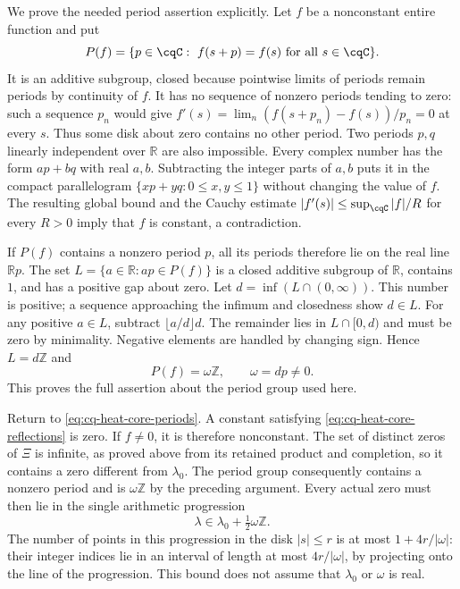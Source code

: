 We prove the needed period assertion explicitly. Let $f$ be a
nonconstant entire function and put
\[
 P(f)=\{p\in\cqC:\ f(s+p)=f(s)\text{ for all }s\in\cqC\}.
\]
It is an additive subgroup, closed because pointwise limits of
periods remain periods by continuity of $f$. It has no sequence
of nonzero periods tending to zero: such a sequence $p_n$ would
give
$f'(s)=\lim_n(f(s+p_n)-f(s))/p_n=0$ at every $s$.
Thus some disk about zero contains no other period.
Two periods $p,q$ linearly independent over $\mathbb R$ are
also impossible. Every complex number has the form $ap+bq$
with real $a,b$. Subtracting the integer parts of $a,b$
puts it in the compact parallelogram
$\{xp+yq:0\leq x,y\leq1\}$ without changing the value of $f$.
The resulting global bound and the Cauchy estimate
$|f'(s)|\leq\sup_{\cqC}|f|/R$ for every $R>0$ imply that
$f$ is constant, a contradiction.

If $P(f)$ contains a nonzero period $p$, all its periods
therefore lie on the real line $\mathbb Rp$. The set
$L=\{a\in\mathbb R:ap\in P(f)\}$ is a closed additive subgroup
of $\mathbb R$, contains $1$, and has a positive gap about zero.
Let $d=\inf(L\cap(0,\infty))$. This number is positive; a
sequence approaching the infimum and closedness show $d\in L$.
For any positive $a\in L$, subtract
$\lfloor a/d\rfloor d$. The remainder lies in $L\cap[0,d)$
and must be zero by minimality. Negative elements are handled
by changing sign. Hence $L=d\mathbb Z$ and
\[
 P(f)=\omega\mathbb Z,\qquad\omega=dp\ne0.
\]
This proves the full assertion about the period group used here.

Return to \eqref{eq:cq-heat-core-periods}. A constant satisfying
\eqref{eq:cq-heat-core-reflections} is zero. If $f\ne0$, it is
therefore nonconstant. The set of distinct zeros of $\Xi$ is
infinite, as proved above from its retained product and completion,
so it contains a zero different from $\lambda_0$.
The period group consequently contains a nonzero period and is
$\omega\mathbb Z$ by the preceding argument. Every actual zero
must then lie in the single arithmetic progression
\begin{equation}\label{eq:cq-heat-core-zero-progression}
 \lambda\in\lambda_0+\tfrac12\omega\mathbb Z.
\end{equation}
The number of points in this progression in the disk $|s|\leq r$
is at most $1+4r/|\omega|$: their integer indices lie in an
interval of length at most $4r/|\omega|$, by projecting onto
the line of the progression. This bound does not assume that
$\lambda_0$ or $\omega$ is real.

